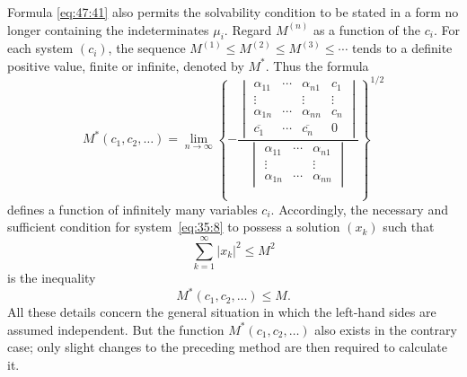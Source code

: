 \documentclass[
  paper=b5,
  fontsize=13pt,
  twoside=true,
  open=any,
  bookmarkpackage=false,
  chapterprefix=true,
  headings=normal
]{scrbook}
\theoremstyle{definition}
\begin{document}
Formula \eqref{eq:47:41} also permits the solvability condition to be stated
in a form no longer containing the indeterminates $\mu_i$. Regard
$M^{(n)}$ as a function of the $c_i$. For each system $(c_i)$, the sequence
$M^{(1)}\leq M^{(2)}\leq M^{(3)}\leq\cdots$ tends to a definite positive
value, finite or infinite, denoted by $M^*$. Thus the formula
\begin{equation}
 M^*(c_1,c_2,\ldots)=\lim_{n\to\infty}
 \left\{-
 \frac{
 \begin{vmatrix}
  \alpha_{11}&\cdots&\alpha_{n1}&c_1\\
  \vdots&&\vdots&\vdots\\
  \alpha_{1n}&\cdots&\alpha_{nn}&c_n\\
  \overline{c_1}&\cdots&\overline{c_n}&0
 \end{vmatrix}}
 {\begin{vmatrix}
  \alpha_{11}&\cdots&\alpha_{n1}\\
  \vdots&&\vdots\\
  \alpha_{1n}&\cdots&\alpha_{nn}
 \end{vmatrix}}\right\}^{1/2}
 \tag{42}\label{eq:47:42}
\end{equation}
defines a function of infinitely many variables $c_i$. Accordingly, the
necessary and sufficient condition for system~\eqref{eq:35:8} to possess a solution
$(x_k)$ such that
\begin{equation}
  \sum_{k=1}^{\infty}|x_k|^2\leq M^2
  \tag{43}\label{eq:47:43}
\end{equation}
is the inequality
\[
  M^*(c_1,c_2,\ldots)\leq M.
\]
All these details concern the general situation in which the left-hand
sides are assumed independent. But the function $M^*(c_1,c_2,\ldots)$
also exists in the contrary case; only slight changes to the preceding
method are then required to calculate it.
\end{document}
